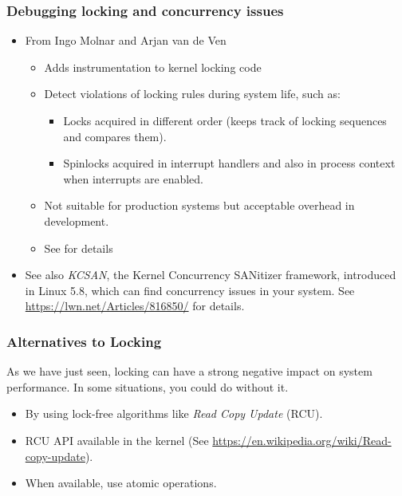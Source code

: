 \begin{frame}
  \frametitle{Debugging locking and concurrency issues}
  \begin{itemize}
  \item From Ingo Molnar and Arjan van de Ven
    \begin{itemize}
    \item Adds instrumentation to kernel locking code
    \item Detect violations of locking rules during system life, such
      as:
      \begin{itemize}
      \item Locks acquired in different order (keeps track of locking
        sequences and compares them).
      \item Spinlocks acquired in interrupt handlers and also in
        process context when interrupts are enabled.
      \end{itemize}
    \item Not suitable for production systems but acceptable overhead
      in development.
    \item See  for details
    \end{itemize}
  \item See also {\em KCSAN}, the Kernel Concurrency SANitizer
        framework, introduced in Linux 5.8, which can find concurrency issues in your system. See
        \url{https://lwn.net/Articles/816850/} for details.
  \end{itemize}
\end{frame}

\begin{frame}
  \frametitle{Alternatives to Locking}
  As we have just seen, locking can have a strong negative
  impact on system performance. In some situations, you could do
  without it.
  \begin{itemize}
  \item By using lock-free algorithms like \emph{Read Copy Update}
    (RCU).
  \item RCU API available in the kernel (See
    \url{https://en.wikipedia.org/wiki/Read-copy-update}).
  \item When available, use atomic operations.
  \end{itemize}
\end{frame}

